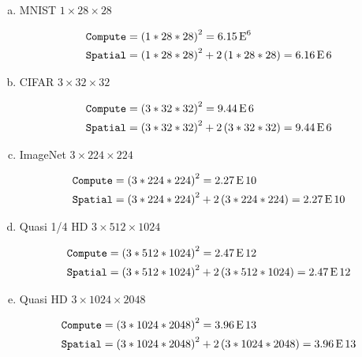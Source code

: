 \documentclass[11pt]{article}
\begin{document}
\begin{enumerate}[(a)]\itemsep0pt
    \item MNIST $1 \times 28 \times 28$
\begin{solution}
	\begin{align}
		\texttt{Compute} &= \left(1*28*28\right)^2 = 6.15\operatorname{E}^{6} \\
		\texttt{Spatial} &= \left(1*28*28\right)^2 + 2\left(1*28*28\right) =
		6.16\operatorname{E}6
	\end{align}
\end{solution}
    \item CIFAR $3 \times 32 \times 32$
\begin{solution}
	\begin{align}
		\texttt{Compute} &= \left(3*32*32\right)^2 = 9.44\operatorname{E}6 \\
		\texttt{Spatial} &= \left(3*32*32\right)^2 + 2\left(3*32*32\right) =
		9.44\operatorname{E}6
	\end{align}
\end{solution}
    \item ImageNet $3 \times 224 \times 224$
\begin{solution}
	\begin{align}
		\texttt{Compute} &= \left(3*224*224\right)^2 = 2.27\operatorname{E}10 \\
		\texttt{Spatial} &= \left(3*224*224\right)^2 + 2\left(3*224*224\right)
		= 2.27\operatorname{E}10
	\end{align}
\end{solution}
    \item Quasi 1/4 HD $3 \times 512 \times 1024$
\begin{solution}
	\begin{align}
		\texttt{Compute} &= \left(3*512*1024\right)^2 = 2.47\operatorname{E}12 \\
		\texttt{Spatial} &= \left(3*512*1024\right)^2 +
		2\left(3*512*1024\right) = 2.47\operatorname{E}12
	\end{align}
\end{solution}
    \item Quasi HD $3 \times 1024 \times 2048$
\begin{solution}
	\begin{align}
		\texttt{Compute} &= \left(3*1024*2048\right)^2 = 3.96\operatorname{E}13 \\
		\texttt{Spatial} &= \left(3*1024*2048\right)^2 +
		2\left(3*1024*2048\right) = 3.96\operatorname{E}13
	\end{align}
\end{solution}
\end{enumerate}
\end{document}
